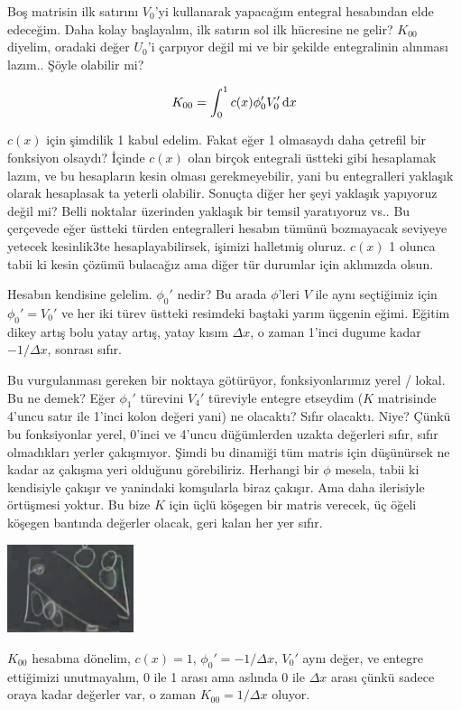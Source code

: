 \documentclass[12pt,fleqn]{article}\usepackage{../../common}
\begin{document}
Boş matrisin ilk satırını $V_0$'yi kullanarak yapacağım entegral hesabından elde
edeceğim. Daha kolay başlayalım, ilk satırın sol ilk hücresine ne gelir?
$K_{00}$ diyelim, oradaki değer $U_0$'i çarpıyor değil mi ve bir şekilde
entegralinin alınması lazım.. Şöyle olabilir mi?

$$
K_{00} = \int _{0}^{1} c(x) \phi_0' V_0' \,\mathrm{d} x
$$

$c(x)$ için şimdilik 1 kabul edelim. Fakat eğer 1 olmasaydı daha çetrefil bir
fonksiyon olsaydı? İçinde $c(x)$ olan birçok entegrali üstteki gibi hesaplamak
lazım, ve bu hesapların kesin olması gerekmeyebilir, yani bu entegralleri
yaklaşık olarak hesaplasak ta yeterli olabilir. Sonuçta diğer her şeyi yaklaşık
yapıyoruz değil mi? Belli noktalar üzerinden yaklaşık bir temsil yaratıyoruz
vs.. Bu çerçevede eğer üstteki türden entegralleri hesabın tümünü bozmayacak
seviyeye yetecek kesinlik3te hesaplayabilirsek, işimizi halletmiş oluruz. $c(x)$
1 olunca tabii ki kesin çözümü bulacağız ama diğer tür durumlar için aklımızda
olsun.

Hesabın kendisine gelelim. $\phi_0'$ nedir? Bu arada $\phi$'leri $V$ ile aynı
seçtiğimiz için $\phi_0' = V_0'$ ve her iki türev üstteki resimdeki baştaki
yarım üçgenin eğimi. Eğitim dikey artış bolu yatay artış, yatay kısım $\Delta
x$, o zaman 1'inci dugume kadar $- 1 / \Delta x$, sonrası sıfır.

Bu vurgulanması gereken bir noktaya götürüyor, fonksiyonlarımız yerel / lokal.
Bu ne demek? Eğer $\phi_1'$ türevini $V_4'$ türeviyle entegre etseydim ($K$
matrisinde 4'uncu satır ile 1'inci kolon değeri yani) ne olacaktı? Sıfır
olacaktı. Niye? Çünkü bu fonksiyonlar yerel, 0'inci ve 4'uncu düğümlerden uzakta
değerleri sıfır, sıfır olmadıkları yerler çakışmıyor. Şimdi bu dinamiği tüm
matris için düşünürsek ne kadar az çakışma yeri olduğunu görebiliriz. Herhangi
bir $\phi$ mesela, tabii ki kendisiyle çakışır ve yanindaki komşularla biraz
çakışır. Ama daha ilerisiyle örtüşmesi yoktur. Bu bize $K$ için üçlü köşegen bir
matris verecek, üç öğeli köşegen bantında değerler olacak, geri kalan her yer
sıfır.

\includegraphics[width=10em]{compscieng_1_18_06.png}

$K_{00}$ hesabına dönelim, $c(x)=1$, $\phi_0' = -1/\Delta x$, $V_0'$ aynı değer,
ve entegre ettiğimizi unutmayalım, 0 ile 1 arası ama aslında 0 ile $\Delta x$
arası çünkü sadece oraya kadar değerler var, o zaman $K_{00} = 1/\Delta x$
oluyor.
\end{document}
